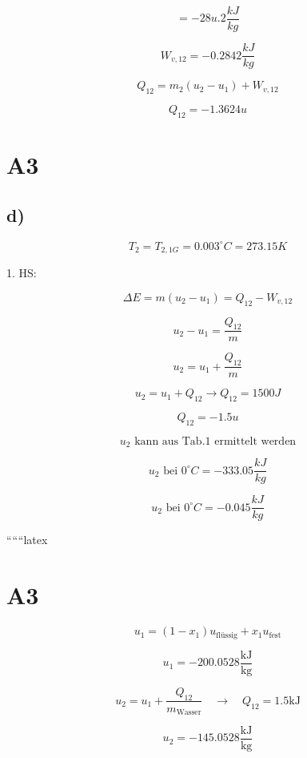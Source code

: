 \[
= -28u.2 \frac{kJ}{kg}
\]

\[
W_{v,12} = -0.2842 \frac{kJ}{kg}
\]

\[
Q_{12} = m_2 (u_2 - u_1) + W_{v,12}
\]

\[
Q_{12} = -1.3624u
\]

\section*{A3}

\subsection*{d)}
\[
T_2 = T_{2,1G} = 0.003^\circ C = 273.15K
\]

1. HS:

\[
\Delta E = m(u_2 - u_1) = Q_{12} - W_{v,12}
\]

\[
u_2 - u_1 = \frac{Q_{12}}{m}
\]

\[
u_2 = u_1 + \frac{Q_{12}}{m}
\]

\[
u_2 = u_1 + Q_{12} \rightarrow Q_{12} = 1500J
\]

\[
Q_{12} = -1.5u
\]

\[
u_2 \text{ kann aus Tab.1 ermittelt werden}
\]

\[
u_2 \text{ bei } 0^\circ C = -333.05 \frac{kJ}{kg}
\]

\[
u_2 \text{ bei } 0^\circ C = -0.045 \frac{kJ}{kg}
\]

``````latex

\section*{A3}

\begin{equation*}
u_1 = (1 - x_1) u_{\text{flüssig}} + x_1 u_{\text{fest}}
\end{equation*}

\begin{equation*}
u_1 = -200.0528 \frac{\text{kJ}}{\text{kg}}
\end{equation*}

\begin{equation*}
u_2 = u_1 + \frac{Q_{12}}{m_{\text{Wasser}}} \quad \rightarrow \quad Q_{12} = 1.5 \text{kJ}
\end{equation*}

\begin{equation*}
u_2 = -145.0528 \frac{\text{kJ}}{\text{kg}}
\end{equation*}

